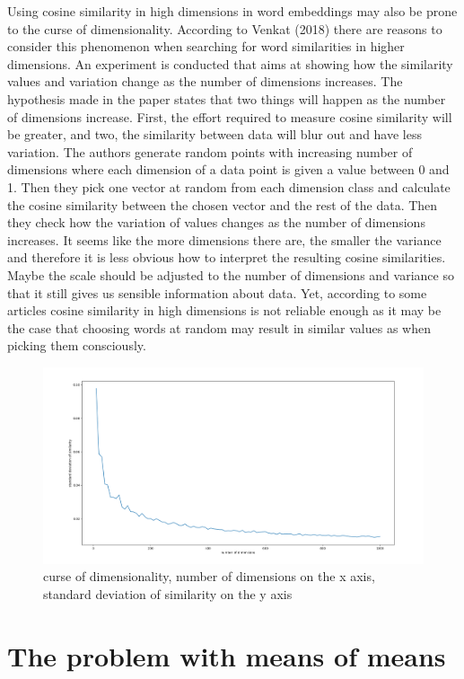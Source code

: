 \documentclass[
  10pt,
  dvipsnames,enabledeprecatedfontcommands]{scrartcl}
\begin{document}
Using cosine similarity in high dimensions in word embeddings may also
be prone to the curse of dimensionality. According to Venkat (2018)
there are reasons to consider this phenomenon when searching for word
similarities in higher dimensions. An experiment is conducted that aims
at showing how the similarity values and variation change as the number
of dimensions increases. The hypothesis made in the paper states that
two things will happen as the number of dimensions increase. First, the
effort required to measure cosine similarity will be greater, and two,
the similarity between data will blur out and have less variation. The
authors generate random points with increasing number of dimensions
where each dimension of a data point is given a value between 0 and 1.
Then they pick one vector at random from each dimension class and
calculate the cosine similarity between the chosen vector and the rest
of the data. Then they check how the variation of values changes as the
number of dimensions increases. It seems like the more dimensions there
are, the smaller the variance and therefore it is less obvious how to
interpret the resulting cosine similarities. Maybe the scale should be
adjusted to the number of dimensions and variance so that it still gives
us sensible information about data. Yet, according to some articles
cosine similarity in high dimensions is not reliable enough as it may be
the case that choosing words at random may result in similar values as
when picking them consciously.

\begin{figure}
\centering
\includegraphics{../images/curseOfDimensionality.png}
\caption{curse of dimensionality, number of dimensions on the x axis,
standard deviation of similarity on the y axis}
\end{figure}

\hypertarget{the-problem-with-means-of-means}{%
\section{The problem with means of
means}\label{the-problem-with-means-of-means}}
\end{document}
